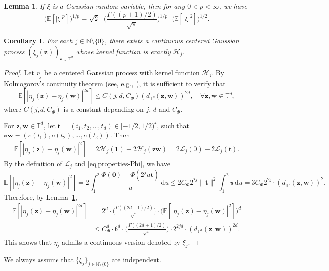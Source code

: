 \documentclass[12pt]{amsart}
\newtheorem{lemma}[theorem]{Lemma}
\newtheorem{corollary}[theorem]{Corollary}
\theoremstyle{definition}
\theoremstyle{remark}
\newcommand{\bt}{\boldsymbol{t}}
\newcommand{\bz}{\boldsymbol{z}}
\newcommand{\bw}{\boldsymbol{w}}
\newcommand{\N}{\mathbb{N}}
\newcommand{\E}{\mathbb{E}}
\newcommand{\T}{\mathbb{T}}
\numberwithin{equation}{section}
\begin{document}
\begin{lemma}\label{lemma:Lp-Gaussian-equiv}
	If $\xi$ is a Gaussian random variable, then for any $0<p<\infty$, we have
	\[
	\big(\E[|\xi|^p]\big)^{1/p}=\sqrt{2}\cdot \bigg(\frac{\Gamma((p+1)/2)}{\sqrt{\pi}}\bigg)^{1/p}\cdot \big(\E[|\xi|^2]\big)^{1/2}.
	\]
\end{lemma}

\begin{corollary}\label{corollary:original-process}
	For each $j\in \N\setminus\{0\} $, there exists a continuous centered Gaussian process $(\xi_j(\bz))_{\bz\in \T^d}$ whose kernel function is exactly $\mathcal{H}_j$. 
\end{corollary}
\begin{proof}
	Let $\eta_j$ be a centered Gaussian process with kernel function $\mathcal{H}_j$.  By Kolmogorov's continuity theorem (see, e.g.,~\cite[Chapter~4, Theorem~4.23]{Kal21}), it is sufficient to verify that 
	\[
	\E[|\eta_j(\bz)-\eta_j(\bw)|^{2d}]\le C(j,d,C_\Phi) (d_{\T^d}(\bz,\bw))^{2d},\quad \forall \bz,\bw\in \T^d,
	\]
	where $C(j,d,C_\Phi)$ is a constant depending on $j$, $d$ and $C_\Phi$.

    For $\bz,\bw\in \T^d$, let $\bt=(t_1,t_2,\ldots,t_d)\in [-1/2,1/2)^d$, such that $\bz\bar{\bw}=(e(t_1),e(t_2),\ldots,e(t_d))$. Then
	\begin{align*}
		\E[|\eta_j(\bz)-\eta_j(\bw)|^2]=2\mathcal{H}_j(\boldsymbol{1})-2\mathcal{H}_j(\bz\bar{\bw})=2\mathcal{L}_j(\boldsymbol{0})-2\mathcal{L}_j(\bt).
	\end{align*}
	By the definition of $\mathcal{L}_j$ and \eqref{eq:properties-Phi}, we have
	\[
		\E[|\eta_j(\bz)-\eta_j(\bw)|^2]=2\int_1^2 \frac{\Phi(\boldsymbol{0})-\Phi(2^ju\bt)}{u}\,\mathrm{d}u\le 2C_\Phi 2^{2j}\|\bt\|^2\int_1^2 u\,\mathrm{d}u=3C_\Phi 2^{2j}\cdot (d_{\T^d}(\bz,\bw))^2.
	\]
    Therefore, by Lemma~\ref{lemma:Lp-Gaussian-equiv},
    \begin{align*}
    \E[|\eta_j(\bz)-\eta_j(\bw)|^{2d}]&= 2^d\cdot  \bigg(\frac{\Gamma((2d+1)/2)}{\sqrt{\pi}}\bigg)\cdot \bigg(\E[|\eta_j(\bz)-\eta_j(\bw)|^2]\bigg)^d\\
    &\le C_\Phi^d\cdot 6^d\cdot \bigg(\frac{\Gamma((2d+1)/2)}{\sqrt{\pi}}\bigg)\cdot 2^{2jd}\cdot (d_{\T^d}(\bz,\bw))^{2d}.
    \end{align*}
    This shows that $\eta_j$ admits a continuous version denoted by $\xi_j$.
\end{proof}

We always assume that $\{\xi_j\}_{j\in \N\setminus \{0\}}$ are independent.
\end{document}
